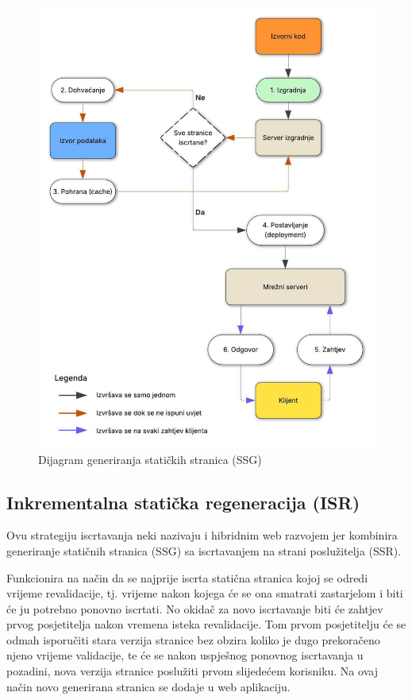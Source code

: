 \begin{figure}[H]
    \centering
    \includegraphics[width=\textwidth]{slike/uvod/SSG.jpg}
    \caption{Dijagram generiranja statičkih stranica (SSG)}
    \label{fig:ssg-diagram}
\end{figure}

\subsection{Inkrementalna statička regeneracija (ISR)}

Ovu strategiju iscrtavanja neki nazivaju i hibridnim web razvojem jer kombinira generiranje statičnih stranica (SSG) sa iscrtavanjem na strani poslužitelja (SSR).

\bigskip

Funkcionira na način da se najprije iscrta statična stranica kojoj se odredi vrijeme revalidacije, tj. vrijeme nakon kojega će se ona smatrati zastarjelom i biti će ju potrebno ponovno  iscrtati. No okidač za novo iscrtavanje biti će zahtjev prvog posjetitelja nakon vremena isteka revalidacije. Tom prvom posjetitelju će se odmah isporučiti stara verzija stranice bez obzira koliko je dugo prekoračeno njeno vrijeme validacije, te će se nakon uspješnog ponovnog iscrtavanja u pozadini, nova verzija stranice poslužiti prvom slijedećem korisniku. Na ovaj način novo generirana stranica se dodaje u web aplikaciju.


